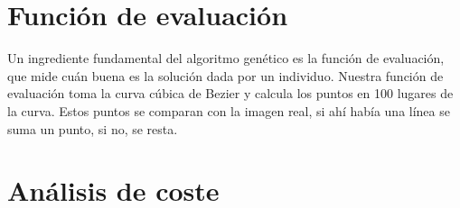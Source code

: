 \documentclass{report}
\begin{document}
\section{Función de evaluación}

Un ingrediente fundamental del algoritmo genético es la función de evaluación, que mide cuán buena
es la solución dada por un individuo. Nuestra función de evaluación toma la curva cúbica de Bezier y 
calcula
los puntos en 100 lugares de la curva. Estos puntos se comparan con la imagen real, si ahí había una línea
se suma un punto, si no, se resta.

\section{Análisis de coste}





\nocite{*}
\end{document}

